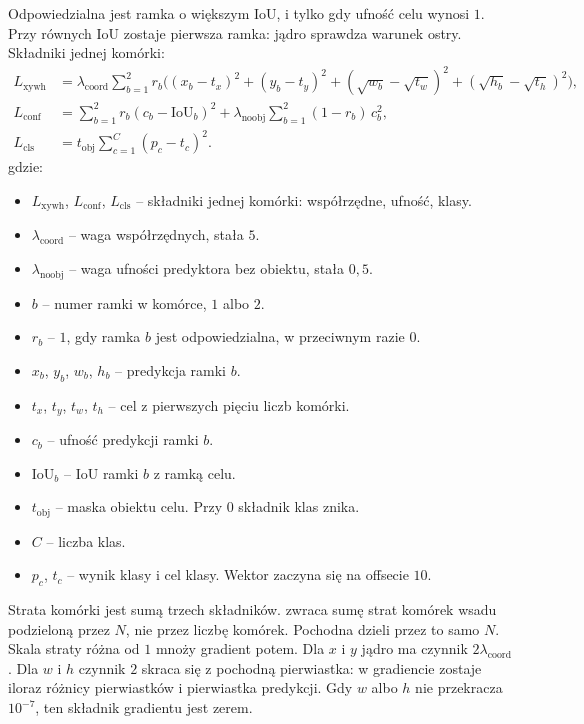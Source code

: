Odpowiedzialna jest ramka o większym IoU, i tylko gdy ufność celu wynosi \(1\). Przy równych IoU zostaje pierwsza ramka: jądro sprawdza warunek ostry. Składniki jednej komórki:
\begin{align}
\label{eq:yolo}
L_{\mathrm{xywh}}
  &= \lambda_{\mathrm{coord}} \sum_{b=1}^{2} r_b \Big(
      (x_b - t_x)^2 + (y_b - t_y)^2
      + (\sqrt{w_b} - \sqrt{t_w})^2
      + (\sqrt{h_b} - \sqrt{t_h})^2 \Big),\\
L_{\mathrm{conf}}
  &= \sum_{b=1}^{2} r_b (c_b - \mathrm{IoU}_b)^2
   + \lambda_{\mathrm{noobj}} \sum_{b=1}^{2} (1 - r_b)\, c_b^2,\\
L_{\mathrm{cls}}
  &= t_{\mathrm{obj}} \sum_{c=1}^{C} (p_c - t_c)^2.
\end{align}
gdzie:
\begin{itemize}
\item \(L_{\mathrm{xywh}}\), \(L_{\mathrm{conf}}\), \(L_{\mathrm{cls}}\) -- składniki jednej komórki: współrzędne, ufność, klasy.
\item \(\lambda_{\mathrm{coord}}\) -- waga współrzędnych, stała \(5\).
\item \(\lambda_{\mathrm{noobj}}\) -- waga ufności predyktora bez obiektu, stała \(0{,}5\).
\item \(b\) -- numer ramki w komórce, \(1\) albo \(2\).
\item \(r_b\) -- \(1\), gdy ramka \(b\) jest odpowiedzialna, w przeciwnym razie \(0\).
\item \(x_b\), \(y_b\), \(w_b\), \(h_b\) -- predykcja ramki \(b\).
\item \(t_x\), \(t_y\), \(t_w\), \(t_h\) -- cel z pierwszych pięciu liczb komórki.
\item \(c_b\) -- ufność predykcji ramki \(b\).
\item \(\mathrm{IoU}_b\) -- IoU ramki \(b\) z ramką celu.
\item \(t_{\mathrm{obj}}\) -- maska obiektu celu. Przy \(0\) składnik klas znika.
\item \(C\) -- liczba klas.
\item \(p_c\), \(t_c\) -- wynik klasy i cel klasy. Wektor zaczyna się na offsecie \(10\).
\end{itemize}

Strata komórki jest sumą trzech składników.  zwraca sumę strat komórek wsadu podzieloną przez \(N\), nie przez liczbę komórek. Pochodna dzieli przez to samo \(N\). Skala straty różna od \(1\) mnoży gradient potem. Dla \(x\) i \(y\) jądro ma czynnik \(2\lambda_{\mathrm{coord}}\). Dla \(w\) i \(h\) czynnik \(2\) skraca się z pochodną pierwiastka: w gradiencie zostaje iloraz różnicy pierwiastków i pierwiastka predykcji. Gdy \(w\) albo \(h\) nie przekracza \(10^{-7}\), ten składnik gradientu jest zerem.

